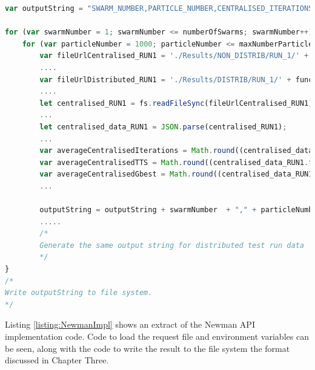 \documentclass[oneside,12pt]{book}
\begin{document}
\begin{lstlisting}[basicstyle=\footnotesize, language=JavaScript]
var outputString = "SWARM_NUMBER,PARTICLE_NUMBER,CENTRALISED_ITERATIONS,CENTRALISED_TIME_TO_SOLUTION,CENTRALISED_FINAL_GROUP_BEST,DISTRIBUTED_ITERATIONS,DISTRIBUTED_TIME_TO_SOLUTION,DISTRIBUTED_FINAL_GROUP_BEST\n";

for (var swarmNumber = 1; swarmNumber <= numberOfSwarms; swarmNumber++) {
    for (var particleNumber = 1000; particleNumber <= maxNumberParticles; particleNumber += particleIncrement) {
        var fileUrlCentralised_RUN1 = './Results/NON_DISTRIB/RUN_1/' + functionName + '/' + functionName + '_' + swarmNumber + '_' + particleNumber + '.result.json';
        ....
        var fileUrlDistributed_RUN1 = './Results/DISTRIB/RUN_1/' + functionName + '/' + functionName + '_' + swarmNumber + '_' + particleNumber + '.result.json';
        ....
        let centralised_RUN1 = fs.readFileSync(fileUrlCentralised_RUN1);
        ...
        let centralised_data_RUN1 = JSON.parse(centralised_RUN1);
        ...
        var averageCentralisedIterations = Math.round((centralised_data_RUN1.iterations + centralised_data_RUN2.iterations + centralised_data_RUN3.iterations)/3);
        var averageCentralisedTTS = Math.round((centralised_data_RUN1.timeToSolution + centralised_data_RUN2.timeToSolution + centralised_data_RUN3.timeToSolution)/3);
        var averageCentralisedGbest = Math.round((centralised_data_RUN1.finalGroupBest + centralised_data_RUN2.finalGroupBest + centralised_data_RUN3.finalGroupBest)/3);
        ...

        outputString = outputString + swarmNumber  + "," + particleNumber + "," + averageCentralisedIterations + "," + averageCentralisedTTS + "," + averageCentralisedGbest + ",";
        .....
        /*
        Generate the same output string for distributed test run data
        */
}
/*
Write outputString to file system. 
*/
\end{lstlisting}
\label{listing:DataAggregation}

Listing \ref{listing:NewmanImpl} shows an extract of the Newman API implementation code. Code to load the request file and environment variables can be seen, along with the code to write the result to the file system the format discussed in Chapter Three. 
\end{document}
